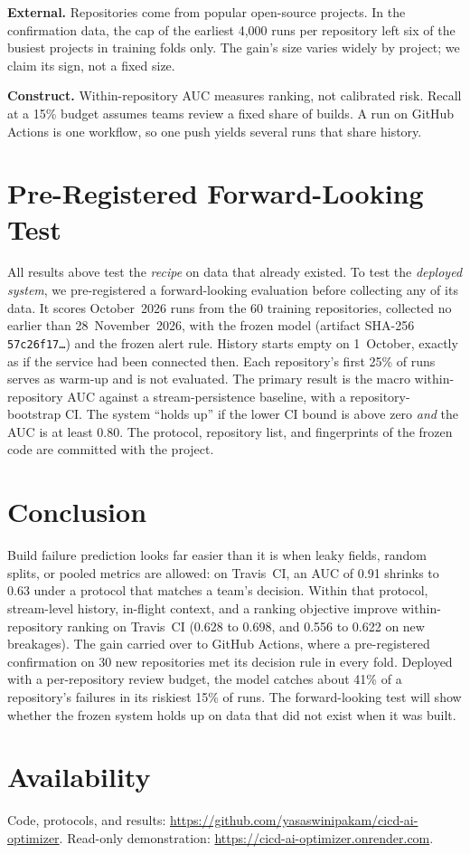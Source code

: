\documentclass[conference]{IEEEtran}
\begin{document}
\textbf{External.} Repositories come from popular open-source projects. In the confirmation data, the cap of the earliest 4{,}000 runs per repository left six of the busiest projects in training folds only. The gain's size varies widely by project; we claim its sign, not a fixed size.

\textbf{Construct.} Within-repository AUC measures ranking, not calibrated risk. Recall at a 15\% budget assumes teams review a fixed share of builds. A run on GitHub Actions is one workflow, so one push yields several runs that share history.

\section{Pre-Registered Forward-Looking Test}
\label{sec:prospective}

All results above test the \emph{recipe} on data that already existed. To test the \emph{deployed system}, we pre-registered a forward-looking evaluation before collecting any of its data. It scores October~2026 runs from the 60 training repositories, collected no earlier than 28~November~2026, with the frozen model (artifact SHA-256 \texttt{57c26f17\ldots}) and the frozen alert rule. History starts empty on 1~October, exactly as if the service had been connected then. Each repository's first 25\% of runs serves as warm-up and is not evaluated. The primary result is the macro within-repository AUC against a stream-persistence baseline, with a repository-bootstrap CI. The system ``holds up'' if the lower CI bound is above zero \emph{and} the AUC is at least 0.80. The protocol, repository list, and fingerprints of the frozen code are committed with the project.

\section{Conclusion}

Build failure prediction looks far easier than it is when leaky fields, random splits, or pooled metrics are allowed: on Travis~CI, an AUC of 0.91 shrinks to 0.63 under a protocol that matches a team's decision. Within that protocol, stream-level history, in-flight context, and a ranking objective improve within-repository ranking on Travis~CI (0.628 to 0.698, and 0.556 to 0.622 on new breakages). The gain carried over to GitHub Actions, where a pre-registered confirmation on 30 new repositories met its decision rule in every fold. Deployed with a per-repository review budget, the model catches about 41\% of a repository's failures in its riskiest 15\% of runs. The forward-looking test will show whether the frozen system holds up on data that did not exist when it was built.

\section*{Availability}
Code, protocols, and results: \url{https://github.com/yasaswinipakam/cicd-ai-optimizer}. Read-only demonstration: \url{https://cicd-ai-optimizer.onrender.com}.



\end{document}
